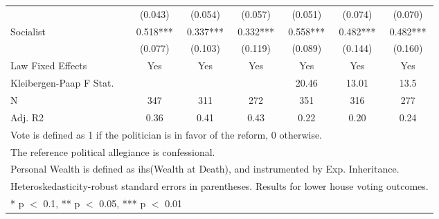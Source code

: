 \begin{table}
\begin{tabular}[t]{lcccccc}
 & (\num{0.043}) & (\num{0.054}) & (\num{0.057}) & (\num{0.051}) & (\num{0.074}) & (\num{0.070})\\
Socialist & \num{0.518}*** & \num{0.337}*** & \num{0.332}*** & \num{0.558}*** & \num{0.482}*** & \num{0.482}***\\
 & (\num{0.077}) & (\num{0.103}) & (\num{0.119}) & (\num{0.089}) & (\num{0.144}) & (\num{0.160})\\
\midrule
Law Fixed Effects & Yes & Yes & Yes & Yes & Yes & Yes\\
Kleibergen-Paap F Stat. &  &  &  & 20.46 & 13.01 & 13.5\\
N & \num{347} & \num{311} & \num{272} & \num{351} & \num{316} & \num{277}\\
Adj. R2 & \num{0.36} & \num{0.41} & \num{0.43} & \num{0.22} & \num{0.20} & \num{0.24}\\
\bottomrule
\multicolumn{7}{l}{\rule{0pt}{1em}Vote is defined as 1 if the politician is in favor of the reform, 0 otherwise.}\\
\multicolumn{7}{l}{\rule{0pt}{1em}The reference political allegiance is confessional.}\\
\multicolumn{7}{l}{\rule{0pt}{1em}Personal Wealth is defined as ihs(Wealth at Death), and instrumented by Exp. Inheritance.}\\
\multicolumn{7}{l}{\rule{0pt}{1em}Heteroskedasticity-robust standard errors in parentheses. Results for lower house voting outcomes.}\\
\multicolumn{7}{l}{\rule{0pt}{1em}* p $<$ 0.1, ** p $<$ 0.05, *** p $<$ 0.01}\\
\end{tabular}
\end{table}
